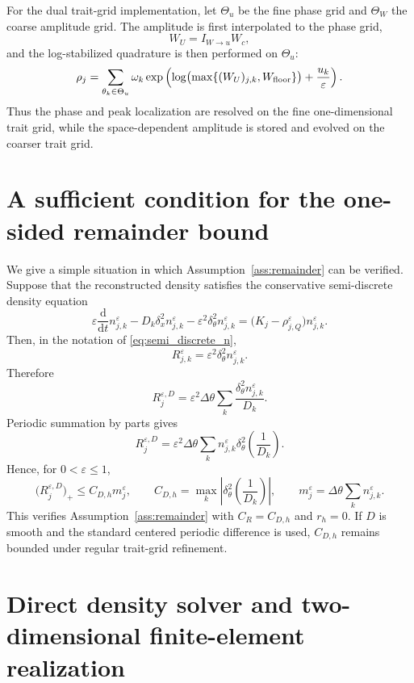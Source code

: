 \documentclass[11pt]{article}
\begin{document}
For the dual trait-grid implementation, let \(\Theta_u\) be the fine phase grid
and \(\Theta_W\) the coarse amplitude grid.  The amplitude is first interpolated
to the phase grid,
\[
    W_U=I_{W\to u}W_c,
\]
and the log-stabilized quadrature is then performed on \(\Theta_u\):
\[
    \rho_j
    =
    \sum_{\theta_k\in\Theta_u}
    \omega_k
    \exp\left(
    \log\bigl(\max\{(W_U)_{j,k},W_{\rm floor}\}\bigr)
    +
    \frac{u_k}{\varepsilon}
    \right).
\]
Thus the phase and peak localization are resolved on the fine one-dimensional
trait grid, while the space-dependent amplitude is stored and evolved on the
coarser trait grid.


\section{A sufficient condition for the one-sided remainder bound}
\label{app:remainder}

We give a simple situation in which Assumption~\ref{ass:remainder} can be
verified.  Suppose that the reconstructed density satisfies the conservative
semi-discrete density equation
\begin{equation}
\label{eq:app_density_compatible_n}
    \varepsilon\frac{\mathrm d}{\mathrm dt}n_{j,k}^\varepsilon
    -
    D_k\delta_x^2 n_{j,k}^\varepsilon
    -
    \varepsilon^2\delta_\theta^2 n_{j,k}^\varepsilon
    =
    \bigl(K_j-\rho_{j,Q}^\varepsilon\bigr)n_{j,k}^\varepsilon .
\end{equation}
Then, in the notation of \eqref{eq:semi_discrete_n},
\[
    R_{j,k}^\varepsilon
    =
    \varepsilon^2\delta_\theta^2 n_{j,k}^\varepsilon .
\]
Therefore
\[
    R_j^{\varepsilon,D}
    =
    \varepsilon^2\Delta\theta
    \sum_k
    \frac{\delta_\theta^2 n_{j,k}^\varepsilon}{D_k}.
\]
Periodic summation by parts gives
\[
    R_j^{\varepsilon,D}
    =
    \varepsilon^2\Delta\theta
    \sum_k
    n_{j,k}^\varepsilon
    \delta_\theta^2\left(\frac{1}{D_k}\right).
\]
Hence, for \(0<\varepsilon\le 1\),
\[
    \bigl(R_j^{\varepsilon,D}\bigr)_+
    \le
    C_{D,h}m_j^\varepsilon,
    \qquad
    C_{D,h}
    =
    \max_k
    \left|
    \delta_\theta^2\left(\frac{1}{D_k}\right)
    \right|,
    \qquad
    m_j^\varepsilon
    =
    \Delta\theta\sum_k n_{j,k}^\varepsilon .
\]
This verifies Assumption~\ref{ass:remainder} with \(C_R=C_{D,h}\) and
\(r_h=0\).  If \(D\) is smooth and the standard centered periodic difference is
used, \(C_{D,h}\) remains bounded under regular trait-grid refinement.


\section{Direct density solver and two-dimensional finite-element realization}
\label{app:direct_2d}
\end{document}
